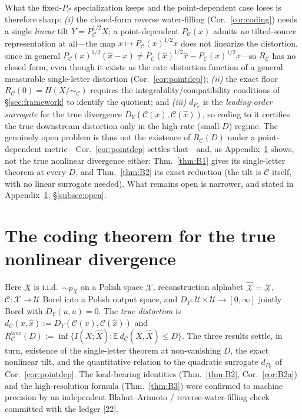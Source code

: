 \documentclass[lettersize,onecolumn]{IEEEtran}
\theoremstyle{definition}
\theoremstyle{remark}
\newcommand{\PC}{P_{\mathcal{C}}}
\newcommand{\E}{\mathbb{E}}
\begin{document}
\noindent What the fixed-$\PC$ specialization keeps and the point-dependent case
loses is therefore sharp: \emph{(i)} the closed-form reverse water-filling
(Cor.~\ref{cor:coding}) needs a single \emph{linear} tilt $Y=\PC^{1/2}X$; a
point-dependent $\PC(x)$ admits \emph{no} tilted-source representation at all---the map
$x\mapsto\PC(x)^{1/2}x$ does not linearize the distortion, since in general
$\PC(x)^{1/2}(\hat x-x)\neq\PC(\hat x)^{1/2}\hat x-\PC(x)^{1/2}x$---so
$R_{\mathcal{C}}$ has no closed form, even though it exists as the rate--distortion
function of a general measurable single-letter distortion (Cor.~\ref{cor:pointdep});
\emph{(ii)} the exact floor $R_{\mathcal{C}}(0)=H(X/\!\sim_{\mathcal{C}})$
requires the integrability/compatibility conditions of \S\ref{sec:framework} to
identify the quotient; and \emph{(iii)} $d_{\PC}$ is the \emph{leading-order surrogate}
for the true divergence $D_Y(\mathcal{C}(x),\mathcal{C}(\hat x))$, so coding to it
certifies the true downstream distortion only in the high-rate (small-$D$) regime. The
genuinely open problem is thus not the existence of $R_{\mathcal{C}}(D)$ under a
point-dependent metric---Cor.~\ref{cor:pointdep} settles that---and, as
Appendix~\ref{app:true} shows, not the true nonlinear divergence either:
Thm.~\ref{thm:B1} gives its single-letter theorem at every $D$, and Thm.~\ref{thm:B2}
its exact reduction (the tilt is $\mathcal{C}$ itself, with no linear surrogate needed).
What remains open is narrower, and stated in Appendix~\ref{app:true}, \S\ref{subsec:open}.

\section{The coding theorem for the true nonlinear divergence}
\label{app:true}

Here $X$ is i.i.d.\ $\sim p_X$ on a Polish space $\mathcal{X}$, reconstruction
alphabet $\hat{\mathcal{X}}=\mathcal{X}$, $\mathcal{C}:\mathcal{X}\to\mathcal{U}$ Borel
into a Polish output space, and $D_Y:\mathcal{U}\times\mathcal{U}\to[0,\infty]$ jointly
Borel with $D_Y(u,u)=0$. The \emph{true distortion} is
$d_{\mathcal{C}}(x,\hat x):=D_Y(\mathcal{C}(x),\mathcal{C}(\hat x))$ and
$R_{\mathcal{C}}^{\mathrm{true}}(D):=\inf\{I(X;\hat X):\E\,d_{\mathcal{C}}(X,\hat X)\le
D\}$. The three results settle, in turn, existence of the single-letter theorem at
non-vanishing $D$, the exact nonlinear tilt, and the quantitative relation to the
quadratic surrogate $d_{\PC}$ of Cor.~\ref{cor:pointdep}. The load-bearing identities
(Thm.~\ref{thm:B2}, Cor.~\ref{cor:B2a}) and the high-resolution formula
(Thm.~\ref{thm:B3}) were confirmed to machine precision by an independent
Blahut--Arimoto / reverse-water-filling check committed with the ledger
[22].
\end{document}
